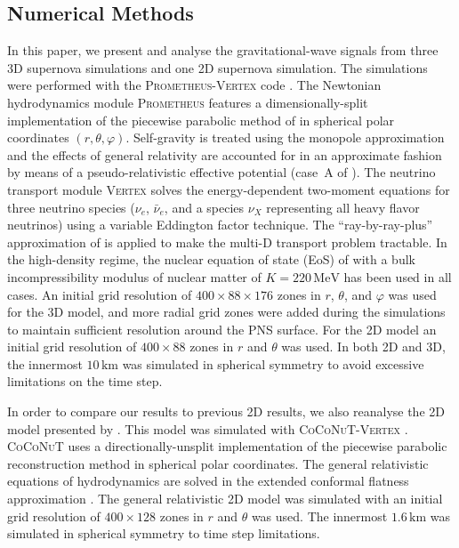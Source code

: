 \subsection{Numerical Methods}
{\comment
In this paper, we present and analyse the gravitational-wave signals
from three 3D supernova simulations and one 2D supernova simulation. 
The simulations were performed with the \textsc{Prometheus-Vertex} code \citep{rampp_02,buras_06a}. }
The Newtonian hydrodynamics module
\textsc{Prometheus} \citep{mueller_91,fryxell_91} features a dimensionally-split
implementation of the piecewise parabolic method of \cite{colella_84}
in spherical polar coordinates $(r,\theta,\varphi)$. Self-gravity is treated using the monopole
approximation and the effects of general relativity are accounted for
in an approximate fashion by means of a pseudo-relativistic
effective potential (case~A of \citealt{marek_06}). The neutrino transport
module \textsc{Vertex} \citep{rampp_02} solves the energy-dependent two-moment
equations for three neutrino species ($\nu_e$, $\bar{\nu}_e$, and a species $\nu_X$ representing
all heavy flavor neutrinos) using a variable Eddington factor technique.
The ``ray-by-ray-plus'' approximation of \citet{buras_06a} is applied to make the
multi-D transport problem tractable. In the high-density regime, the nuclear equation of  state (EoS) of \citet{lattimer_91} with a bulk incompressibility modulus of nuclear matter of $K=220 \,\mathrm{MeV}$
has been used in all cases. An initial grid resolution of $400\times 88 \times 176$ zones in $r$, $\theta$, and $\varphi$ was used for the 3D model, and more radial grid zones were added
during the simulations to maintain sufficient resolution around the PNS surface.
{\comment For the 2D model an initial grid resolution of $400 \times 88$ zones in $r$ and $\theta$ was used.
In both 2D and 3D, the innermost $10 \, \mathrm{km}$ was simulated in spherical symmetry to avoid
excessive limitations on the time step.}

{\comment
In order to compare our results to previous 2D results, we also reanalyse the 2D model presented
by \citealt{mueller_13}. This model was simulated with \textsc{CoCoNuT-Vertex} \citep{mueller_10}. 
\textsc{CoCoNuT} \citep{dimmelmeier_02_a,dimmelmeier_04} uses a directionally-unsplit
implementation of the piecewise parabolic reconstruction method in spherical polar coordinates.
The general relativistic equations of hydrodynamics are solved in the extended conformal flatness approximation \citep{cordero_09}. The general relativistic 2D model was simulated with an initial grid resolution of $400 \times 128$ zones in $r$ and $\theta$ was used. The innermost $1.6 \, \mathrm{km}$ was simulated in spherical symmetry to time step limitations.}
